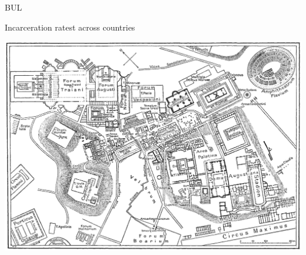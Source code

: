 \begin{map}{B}{UL}
\caption{Incarceration ratest across countries}
\label{chart:incarceration}
\includegraphics[width=\chartwidth,height=\chartheight]{Rome}  
\end{map}


%
%
%

%

